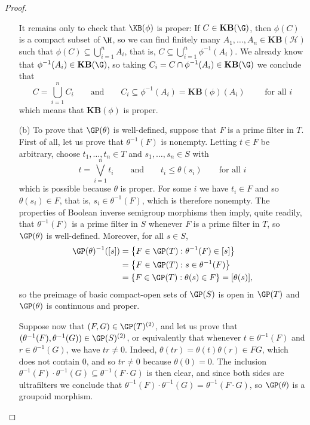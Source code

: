 \begin{proof}
\begin{enumerate}
It remains only to check that $\KB(\phi)$ is proper: If $C\in\mathbf{KB}(\G)$, then $\phi(C)$ is a compact subset of $\H$, so we can find finitely many $A_1,\ldots,A_n\in\mathbf{KB}(\mathcal{H})$ such that $\phi(C)\subseteq\bigcup_{i=1}^n A_i$, that is, $C\subseteq\bigcup_{i=1}^n\phi^{-1}(A_i)$. We already know that $\phi^{-1}(A_i)\in\mathbf{KB}(\G)$, so taking $C_i=C\cap\phi^{-1}(A_i)\in\mathbf{KB}(\G)$ we conclude that
\[C=\bigcup_{i=1}^n C_i\qquad\text{and}\qquad C_i\subseteq\phi^{-1}(A_i)=\mathbf{KB}(\phi)(A_i)\qquad\text{ for all }i\]
which means that $\mathbf{KB}(\phi)$ is proper.
 \item[(b)] To prove that $\GP(\theta)$ is well-defined, suppose that $F$ is a prime filter in $T$. First of all, let us prove that $\theta^{-1}(F)$ is nonempty. Letting $t\in F$ be arbitrary, choose $t_1,\ldots,t_n\in T$ and $s_1,\ldots,s_n\in S$ with
 \[t=\bigvee_{i=1}^n t_i\qquad\text{and}\qquad t_i\leq\theta(s_i)\qquad\text{for all }i\]
 which is possible because $\theta$ is proper. For some $i$ we have $t_i\in F$ and so $\theta(s_i)\in F$, that is, $s_i\in\theta^{-1}(F)$, which is therefore nonempty. The properties of Boolean inverse semigroup morphisms then imply, quite readily, that $\theta^{-1}(F)$ is a prime filter in $S$ whenever $F$ is a prime filter in $T$, so $\GP(\theta)$ is well-defined. Moreover, for all $s\in S$,
\begin{align*}\GP(\theta)^{-1}([s])&=\left\{F\in\GP(T):\theta^{-1}(F)\in[s]\right\}\\
&=\left\{F\in\GP(T):s\in\theta^{-1}(F)\right\}\\
&=\left\{F\in\GP(T):\theta(s)\in F\right\}=[\theta(s)],
\end{align*}
so the preimage of basic compact-open sets of $\GP(S)$ is open in $\GP(T)$ and $\GP(\theta)$ is continuous and proper.
 
 
Suppose now that $(F,G)\in\GP(T)^{(2)}$, and let us prove that $(\theta^{-1}(F),\theta^{-1}(G))\in\GP(S)^{(2)}$, or equivalently that whenever $t\in\theta^{-1}(F)$ and $r\in\theta^{-1}(G)$, we have $tr\neq 0$. Indeed, $\theta(tr)=\theta(t)\theta(r)\in FG$, which does not contain $0$, and so $tr\neq 0$ because $\theta(0)=0$. The inclusion $\theta^{-1}(F)\cdot\theta^{-1}(G)\subseteq\theta^{-1}(F\cdot G)$ is then clear, and since both sides are ultrafilters we conclude that $\theta^{-1}(F)\cdot \theta^{-1}(G)=\theta^{-1}(F\cdot G)$, so $\GP(\theta)$ is a groupoid morphism.


\end{enumerate}
\end{proof}
